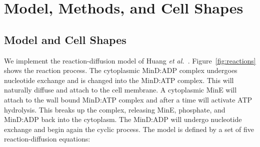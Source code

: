 \documentclass[letterpaper,twocolumn,amsmath,amssymb,pre]{revtex4-1}
\begin{document}
\section{Model, Methods, and Cell Shapes}\label{sec:model-method-shapes}
\subsection*{Model and Cell Shapes}
\label{sec:model-method-shapes}
We implement the reaction-diffusion model of Huang \emph{et
  al.}~\cite{huang2003dynamic}.  Figure~\ref{fig:reactions} shows the
reaction process.  The cytoplasmic MinD:ADP complex undergoes
nucleotide exchange and is changed into the MinD:ATP complex.  This
will naturally diffuse and attach to the cell membrane.  A cytoplasmic
MinE will attach to the wall bound MinD:ATP complex and after a time
will activate ATP hydrolysis.  This breaks up the complex, releasing
MinE, phosphate, and MinD:ADP back into the cytoplasm.  The MinD:ADP
will undergo nucleotide exchange and begin again the cyclic process.
The model is defined by a set of five reaction-diffusion equations:
\end{document}
